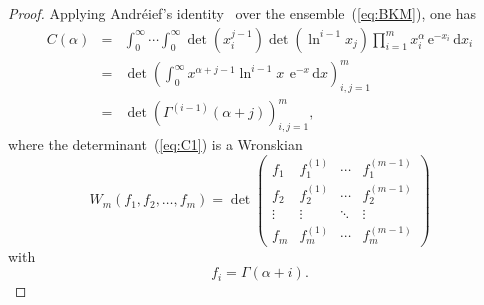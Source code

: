 \documentclass[pdflatex,sn-mathphys-num]{sn-jnl}%
\theoremstyle{thmstyleone}
\newcommand{\dd}{\,\mathrm{d}}
\newcommand{\ee}{\,\mathrm{e}}
\begin{document}
\begin{proof}
Applying Andr\'{e}ief's identity~\cite{Forrester} over the ensemble~(\ref{eq:BKM}), one has
\begin{eqnarray}
C(\alpha) &=&\int_{0}^{\infty}\!\!\!\!\cdots\!\int_{0}^{\infty}\det\left(x_{i}^{j-1}\right)\det\left(\ln^{i-1}\!x_{j}\right)\prod_{i=1}^{m}x_{i}^{\alpha} \ee^{-x_{i}}\dd x_{i} \\
&=& \det\left(\int_{0}^{\infty}\!x^{\alpha+j-1}\ln^{i-1}\!x~\!\ee^{-x}\dd x\right)_{i,j=1}^{m} \\
&=& \det\left(\Gamma^{(i-1)}(\alpha+j)\right)_{i,j=1}^{m}, \label{eq:C1}
\end{eqnarray}
where the determinant~(\ref{eq:C1}) is a Wronskian~\cite{Karlin}
\begin{equation}\label{eq}
W_{m}\left(f_{1},f_{2},\dots,f_{m}\right)=\det
\begin{pmatrix}
f_{1} & f_{1}^{(1)} & \cdots & f_{1}^{(m-1)} \\
f_{2} & f_{2}^{(1)} & \cdots & f_{2}^{(m-1)} \\
\vdots & \vdots & \ddots & \vdots \\
f_{m} & f_{m}^{(1)} & \cdots & f_{m}^{(m-1)}
\end{pmatrix}	
\end{equation}
with
\begin{equation}
f_{i}=\Gamma(\alpha+i).
\end{equation}


\end{proof}
\end{document}
